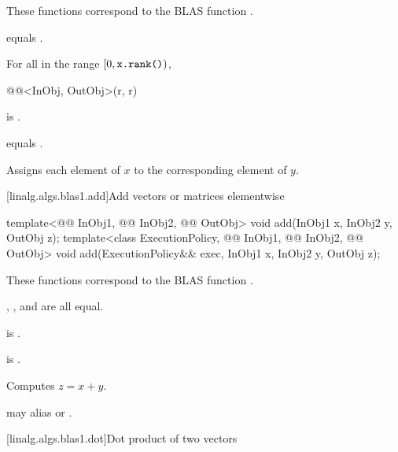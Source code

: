 \begin{itemdescr}
\pnum
\begin{note}
These functions correspond to the BLAS function .
\end{note}

\pnum
\constraints
{} equals .

\pnum
\mandates
For all  in the range $[ 0, \texttt{\protect x.rank()})$,
\begin{codeblock}
@@<InObj, OutObj>(r, r)
\end{codeblock}
is .

\pnum
\expects
{} equals .

\pnum
\effects
Assigns each element of $x$ to the corresponding element of $y$.
\end{itemdescr}

[linalg.algs.blas1.add]{Add vectors or matrices elementwise}

%
\begin{itemdecl}
template<@@ InObj1, @@ InObj2, @@ OutObj>
  void add(InObj1 x, InObj2 y, OutObj z);
template<class ExecutionPolicy, @@ InObj1, @@ InObj2, @@ OutObj>
  void add(ExecutionPolicy&& exec,
           InObj1 x, InObj2 y, OutObj z);
\end{itemdecl}

\begin{itemdescr}
\pnum
\begin{note}
These functions correspond to the BLAS function \supercite{blas1}.
\end{note}

\pnum
\constraints
{}, , and  are all equal.

\pnum
\mandates
{} is .

\pnum
\expects
{} is .

\pnum
\effects
Computes $z = x + y$.

\pnum
\remarks
{} may alias  or .
\end{itemdescr}

[linalg.algs.blas1.dot]{Dot product of two vectors}

